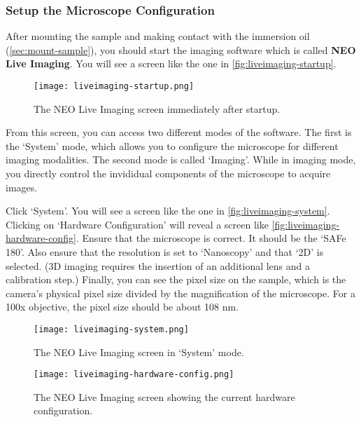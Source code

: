 \documentclass[10pt,a4paper,oneside]{book}
\begin{document}
\subsubsection{Setup the Microscope Configuration}

After mounting the sample and making contact with the immersion oil (\autoref{sec:mount-sample}), you should start the imaging software which is called \textbf{NEO Live Imaging}. You will see a screen like the one in \autoref{fig:liveimaging-startup}.

\begin{figure}[ht]
    \centering
    \texttt{[image: liveimaging-startup.png]}
    \caption{The NEO Live Imaging screen immediately after startup.}
    \label{fig:liveimaging-startup}
\end{figure}

From this screen, you can access two different modes of the software. The first is the `System' mode, which allows you to configure the microscope for different imaging modalities. The second mode is called `Imaging'. While in imaging mode, you directly control the invididual components of the microscope to acquire images.

Click `System'. You will see a screen like the one in \autoref{fig:liveimaging-system}. Clicking on `Hardware Configuration' will reveal a screen like \autoref{fig:liveimaging-hardware-config}. Ensure that the microscope is correct. It should be the `SAFe 180'. Also ensure that the resolution is set to `Nanoscopy' and that `2D' is selected. (3D imaging requires the insertion of an additional lens and a calibration step.) Finally, you can see the pixel size on the sample, which is the camera's physical pixel size divided by the magnification of the microscope. For a 100x objective, the pixel size should be about 108 nm.

\begin{figure}[ht]
    \centering
    \texttt{[image: liveimaging-system.png]}
    \caption{The NEO Live Imaging screen in `System' mode.}
    \label{fig:liveimaging-system}
\end{figure}

\begin{figure}[ht]
    \centering
    \texttt{[image: liveimaging-hardware-config.png]}
    \caption{The NEO Live Imaging screen showing the current hardware configuration.}
    \label{fig:liveimaging-hardware-config}
\end{figure}
\end{document}
